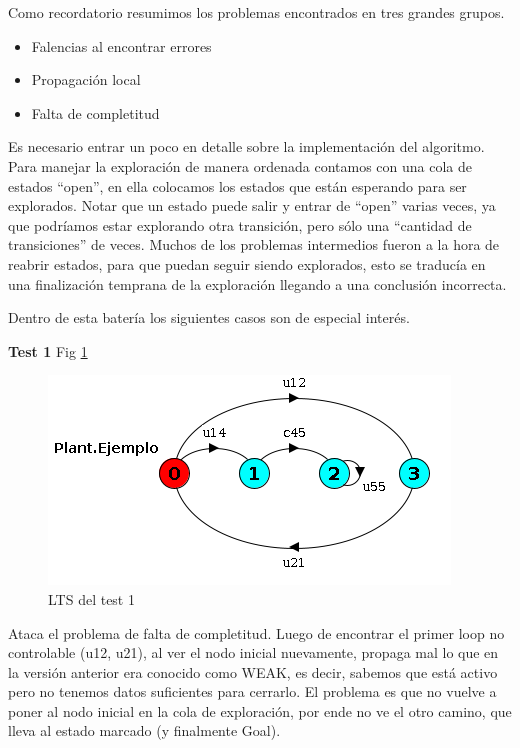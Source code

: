 Como recordatorio resumimos los problemas encontrados en tres grandes grupos.
\begin{itemize}
 \item Falencias al encontrar errores
 \item Propagación local
 \item Falta de completitud
\end{itemize}

Es necesario entrar un poco en detalle sobre la implementación del algoritmo. Para manejar la exploración de manera ordenada contamos con una cola de estados ``open'', en ella colocamos los estados que están esperando para ser explorados. Notar que un estado puede salir y entrar de ``open'' varias veces, ya que podríamos estar explorando otra transición, pero sólo una ``cantidad de transiciones'' de veces. Muchos de los problemas intermedios fueron a la hora de reabrir estados, para que puedan seguir siendo explorados, esto se traducía en una finalización temprana de la exploración llegando a una conclusión incorrecta.

Dentro de esta batería los siguientes casos son de especial interés.
\bigskip

\textbf{Test 1} Fig \ref{fig:test1}
\begin{figure}
 \centering
 \includegraphics[scale=0.7]{figures/tests/test1.png}
 \caption{LTS del test 1}
 \label{fig:test1}
\end{figure}
Ataca el problema de falta de completitud. Luego de encontrar el primer loop no controlable (u12, u21), al ver el nodo inicial nuevamente, propaga mal lo que en la versión anterior era conocido como WEAK, es decir, sabemos que está activo pero no tenemos datos suficientes para cerrarlo. El problema es que no vuelve a poner al nodo inicial en la cola de exploración, por ende no ve el otro camino, que lleva al estado marcado (y finalmente Goal).


